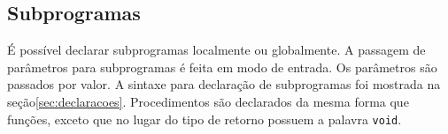 \subsection{Subprogramas}
\label{sec:funcoes}
É possível declarar subprogramas localmente ou globalmente.
A passagem de parâmetros para subprogramas é feita em modo de entrada. 
Os parâmetros são passados por valor.
A sintaxe para declaração de subprogramas foi mostrada na seção\ref{sec:declaracoes}.
Procedimentos são declarados da mesma forma que funções, exceto que no lugar do tipo de retorno possuem a palavra \texttt{void}.